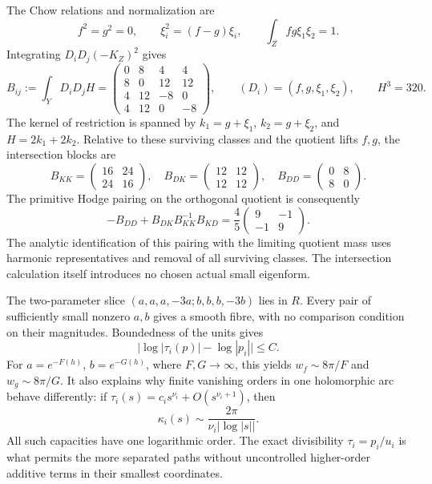 The Chow relations and normalization are
\[
 f^2=g^2=0,\qquad \xi_i^2=(f-g)\xi_i,\qquad
 \int_Zfg\xi_1\xi_2=1.
\]
Integrating $D_iD_j(-K_Z)^2$ gives
\begin{equation}\label{eq:intersection-matrix}
 B_{ij}:=\int_YD_iD_jH=
 \begin{pmatrix}
 0&8&4&4\\8&0&12&12\\4&12&-8&0\\4&12&0&-8
 \end{pmatrix},\qquad (D_i)=(f,g,\xi_1,\xi_2),
 \qquad H^3=320.
\end{equation}
The kernel of restriction is spanned by
$k_1=g+\xi_1$, $k_2=g+\xi_2$, and $H=2k_1+2k_2$.
Relative to these surviving classes and the quotient lifts $f,g$,
the intersection blocks are
\begin{equation}\label{eq:intersection-blocks}
 B_{KK}=\begin{pmatrix}16&24\\24&16\end{pmatrix},\quad
 B_{DK}=\begin{pmatrix}12&12\\12&12\end{pmatrix},\quad
 B_{DD}=\begin{pmatrix}0&8\\8&0\end{pmatrix}.
\end{equation}
The primitive Hodge pairing on the orthogonal quotient is consequently
\begin{equation}\label{eq:mass-computation}
 -B_{DD}+B_{DK}B_{KK}^{-1}B_{KD}
       =\frac45\begin{pmatrix}9&-1\\-1&9\end{pmatrix}.
\end{equation}
The analytic identification of this pairing with the limiting quotient
mass uses harmonic representatives and removal of all surviving
classes. The intersection calculation itself introduces no chosen
actual small eigenform.

The two-parameter slice $(a,a,a,-3a;b,b,b,-3b)$ lies in $R$.
Every pair of sufficiently small nonzero $a,b$ gives a smooth fibre,
with no comparison condition on their magnitudes. Boundedness of the
units gives
\begin{equation}\label{eq:log-unit-control}
 \bigl|\log|\tau_i(p)|-\log|p_i|\bigr|\le C.
\end{equation}
For $a=e^{-F(h)}$, $b=e^{-G(h)}$, where $F,G\to\infty$, this yields
$w_f\sim8\pi/F$ and $w_g\sim8\pi/G$. It also explains why finite
vanishing orders in one holomorphic arc behave differently: if
$\tau_i(s)=c_i s^{\nu_i}+O(s^{\nu_i+1})$, then
\[
 \kappa_i(s)\sim\frac{2\pi}{\nu_i|\log|s||}.
\]
All such capacities have one logarithmic order. The exact divisibility
$\tau_i=p_i/u_i$ is what permits the more separated paths without
uncontrolled higher-order additive terms in their smallest coordinates.
